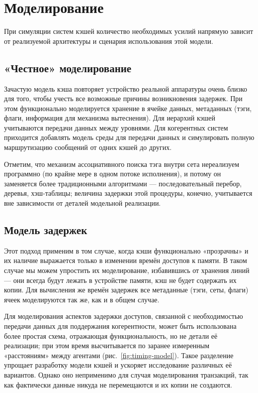 \section{Моделирование}

При симуляции систем кэшей количество необходимых усилий напрямую зависит от реализуемой архитектуры и сценария использования этой модели.

\subsection{«Честное» моделирование}

Зачастую модель кэша повторяет устройство реальной аппаратуры очень близко для того, чтобы учесть все возможные причины возникновения задержек. При этом функционально моделируется хранение в ячейке данных, метаданных (тэги, флаги, информация для механизма вытеснения). Для иерархий кэшей учитываются передачи данных между уровнями. Для когерентных систем приходится добавлять модель среды для передачи данных и симулировать полную маршрутизацию сообщений от одних кэшей до других.

Отметим, что механизм ассоциативного поиска тэга внутри сета нереализуем программно (по крайне мере в одном потоке исполнения), и потому он заменяется более традиционными алгоритмами — последовательный перебор, деревья, хэш-таблицы; величина задержки этой процедуры, конечно, учитывается вне зависимости от деталей модельной реализации.

\subsection{Модель задержек}

Этот подход применим в том случае, когда кэши функционально «прозрачны» и их наличие выражается только в изменении времён доступов к памяти. В таком случае мы можем упростить их моделирование,  избавившись от хранения линий — они всегда будут лежать в устройстве памяти, кэш не будет содержать их копии. Для вычисления же времён задержек все метаданные (тэги, сеты, флаги) ячеек моделируются так же, как и в общем случае.

Для моделирования аспектов задержки доступов, связанной с необходимостью передачи данных для поддержания когерентности, может быть использована более простая схема, отражающая функциональность, но не детали её реализации; при этом время высчитывается по заранее измеренным «расстояниям» между агентами (рис.~\ref{fig:timing-model}). Такое разделение упрощает разработку модели кэшей и ускоряет исследование различных её вариантов. Однако оно неприменимо для случая моделирования транзакций, так как фактически данные никуда не перемещаются и их копии не создаются.

